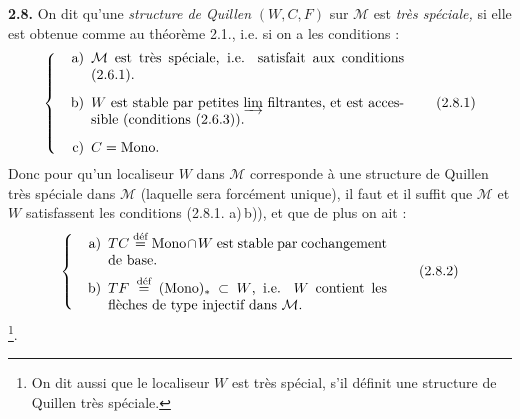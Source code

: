 \textbf{2.8.} On dit qu'une \textit{structure de Quillen} $(W,C,F)$ sur $\mathcal{M}$ est \textit{très spéciale,} si elle est obtenue comme au théorème 2.1., i.e. si on a les conditions :
\[ \left\{ \begin{minipage}{0.72\textwidth}
\begin{itemize}[leftmargin=2.5em]
\item[a)] $\mathcal{M}$ est très spéciale, i.e. satisfait aux conditions (2.6.1).
\item[b)] $W$ est stable par petites $\varinjlim$ filtrantes, et est accessible (conditions (2.6.3)).
\item[c)] $C = \Mono$.
\end{itemize}
\end{minipage}\right. \tag*{(2.8.1)} \]
Donc pour qu'un localiseur $W$ dans $\mathcal{M}$ corresponde à une structure de Quillen très spéciale  dans $\mathcal{M}$ (laquelle sera forcément unique), il faut et il suffit que $\mathcal{M}$ et $W$ satisfassent les conditions (2.8.1. a)\,b)), et que de plus on ait :
\[ \left\{ \begin{minipage}{0.65\textwidth}
\begin{itemize}[leftmargin=2.5em]
\item[a)] $TC \deq \Mono\cap W$ est stable par cochangement de base.
\item[b)] $TF \deq (\Mono)_* \subset W$, i.e. $W$ contient les flèches de type injectif dans $\mathcal{M}$.
\end{itemize}
\end{minipage}\right. \tag*{(2.8.2)} \]
\footnote[16]{On dit aussi que le localiseur $W$ est très spécial, s'il définit une structure de Quillen très spéciale.}.

